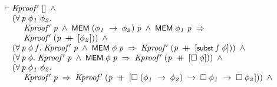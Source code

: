 \documentclass{report}
\renewcommand{\HOLConst}[1]{{\textsf{\upshape\small #1}}}
\newenvironment{holmath}{\begin{displaymath}\begin{array}{l}}{\end{array}\end{displaymath}\ignorespacesafterend}
\begin{document}
\begin{holmath}
  \ensuremath{\HOLTokenTurnstile}\HOLFreeVar{Kproof\sp{\prime}}\;[]\;\HOLSymConst{\HOLTokenConj{}}\\
\;\;\;\;\;(\HOLSymConst{\HOLTokenForall{}}\HOLBoundVar{p}\;\HOLBoundVar{\ensuremath{\phi\sb{1}}}\;\HOLBoundVar{\ensuremath{\phi\sb{2}}}.\\
\;\;\;\;\;\;\;\;\;\;\HOLFreeVar{Kproof\sp{\prime}}\;\HOLBoundVar{p}\;\HOLSymConst{\HOLTokenConj{}}\;\HOLConst{MEM}\;(\HOLBoundVar{\ensuremath{\phi\sb{1}}}\;\HOLSymConst{\ensuremath{\rightarrow}}\;\HOLBoundVar{\ensuremath{\phi\sb{2}}})\;\HOLBoundVar{p}\;\HOLSymConst{\HOLTokenConj{}}\;\HOLConst{MEM}\;\HOLBoundVar{\ensuremath{\phi\sb{1}}}\;\HOLBoundVar{p}\;\HOLSymConst{\HOLTokenImp{}}\\
\;\;\;\;\;\;\;\;\;\;\HOLFreeVar{Kproof\sp{\prime}}\;(\HOLBoundVar{p}\;\HOLSymConst{\HOLTokenDoublePlus}\;[\HOLBoundVar{\ensuremath{\phi\sb{2}}}]))\;\HOLSymConst{\HOLTokenConj{}}\\
\;\;\;\;\;(\HOLSymConst{\HOLTokenForall{}}\HOLBoundVar{p}\;\HOLBoundVar{\ensuremath{\phi}}\;\HOLBoundVar{f}.\;\HOLFreeVar{Kproof\sp{\prime}}\;\HOLBoundVar{p}\;\HOLSymConst{\HOLTokenConj{}}\;\HOLConst{MEM}\;\HOLBoundVar{\ensuremath{\phi}}\;\HOLBoundVar{p}\;\HOLSymConst{\HOLTokenImp{}}\;\HOLFreeVar{Kproof\sp{\prime}}\;(\HOLBoundVar{p}\;\HOLSymConst{\HOLTokenDoublePlus}\;[\HOLConst{subst}\;\HOLBoundVar{f}\;\HOLBoundVar{\ensuremath{\phi}}]))\;\HOLSymConst{\HOLTokenConj{}}\\
\;\;\;\;\;(\HOLSymConst{\HOLTokenForall{}}\HOLBoundVar{p}\;\HOLBoundVar{\ensuremath{\phi}}.\;\HOLFreeVar{Kproof\sp{\prime}}\;\HOLBoundVar{p}\;\HOLSymConst{\HOLTokenConj{}}\;\HOLConst{MEM}\;\HOLBoundVar{\ensuremath{\phi}}\;\HOLBoundVar{p}\;\HOLSymConst{\HOLTokenImp{}}\;\HOLFreeVar{Kproof\sp{\prime}}\;(\HOLBoundVar{p}\;\HOLSymConst{\HOLTokenDoublePlus}\;[\HOLSymConst{\ensuremath{\Box}}\;\HOLBoundVar{\ensuremath{\phi}}]))\;\HOLSymConst{\HOLTokenConj{}}\\
\;\;\;\;\;(\HOLSymConst{\HOLTokenForall{}}\HOLBoundVar{p}\;\HOLBoundVar{\ensuremath{\phi\sb{1}}}\;\HOLBoundVar{\ensuremath{\phi\sb{2}}}.\\
\;\;\;\;\;\;\;\;\;\;\HOLFreeVar{Kproof\sp{\prime}}\;\HOLBoundVar{p}\;\HOLSymConst{\HOLTokenImp{}}\;\HOLFreeVar{Kproof\sp{\prime}}\;(\HOLBoundVar{p}\;\HOLSymConst{\HOLTokenDoublePlus}\;[\HOLSymConst{\ensuremath{\Box}}\;(\HOLBoundVar{\ensuremath{\phi\sb{1}}}\;\HOLSymConst{\ensuremath{\rightarrow}}\;\HOLBoundVar{\ensuremath{\phi\sb{2}}})\;\HOLSymConst{\ensuremath{\rightarrow}}\;\HOLSymConst{\ensuremath{\Box}}\;\HOLBoundVar{\ensuremath{\phi\sb{1}}}\;\HOLSymConst{\ensuremath{\rightarrow}}\;\HOLSymConst{\ensuremath{\Box}}\;\HOLBoundVar{\ensuremath{\phi\sb{2}}}]))\;\HOLSymConst{\HOLTokenConj{}}\\

\end{holmath}
\end{document}
